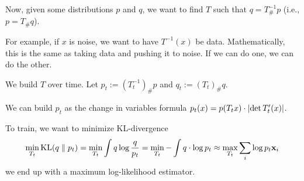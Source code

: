 \documentclass[notes]{agony}
\newcommand{\x}{\vb{x}}
\DeclareMathOperator{\KL}{KL}
\begin{document}
Now, given some distributions $p$ and $q$,
we want to find $T$ such that $q = T_\#^{-1}p$
(i.e., $p = T_\#q$).

For example, if $x$ is noise, we want to have $T^{-1}(x)$ be data.
Mathematically, this is the same as taking data and pushing it to noise.
If we can do one, we can do the other.

We build $T$ over time.
Let $p_t := (T_t^{-1})_\# p$ and $q_t := (T_t)_\#q$.

We can build $p_t$ as the change in variables formula
$p_t(x) = p(T_t x) \cdot \abs{\det T_t'(x)}$.

To train, we want to minimize KL-divergence 
\begin{align*}
	\min_{T_t} \KL(q \parallel p_t) = \min_{T_t} \int q \log\frac{q}{p_t}
	= \min_{T_t} -\int q \cdot \log p_t \approx \max_{T_t} \sum_i \log p_t \x_i
\end{align*}
we end up with a maximum log-likelihood estimator.
\end{document}
